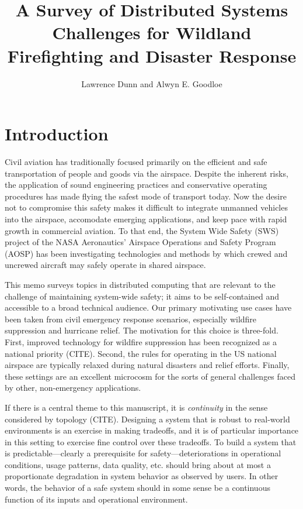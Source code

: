 \documentclass[]             %
{NASA}                       %
\title{A Survey of Distributed Systems Challenges for Wildland
Firefighting and Disaster Response}
\author{Lawrence Dunn and Alwyn E. Goodloe}
\theoremstyle{definition}
\begin{document}
\newpage
\setcounter{tocdepth}{2}
\tableofcontents
\newpage

\hypertarget{introduction}{%
\section{Introduction}\label{introduction}}

Civil aviation has traditionally focused primarily on the efficient and
safe transportation of people and goods via the airspace. Despite the
inherent risks, the application of sound engineering practices and
conservative operating procedures has made flying the safest mode of
transport today. Now the desire not to compromise this safety makes it
difficult to integrate unmanned vehicles into the airspace, accomodate
emerging applications, and keep pace with rapid growth in commercial
aviation. To that end, the System Wide Safety (SWS) project of the NASA
Aeronautics' Airspace Operations and Safety Program (AOSP) has been
investigating technologies and methods by which crewed and uncrewed
aircraft may safely operate in shared airspace.

This memo surveys topics in distributed computing that are relevant to
the \mbox{challenge} of maintaining system-wide safety; it aims to be
self-contained and accessible to a broad technical audience. Our primary
motivating use cases have been taken from civil emergency response
scenarios, especially wildfire suppression and hurricane relief. The
motivation for this choice is three-fold. First, improved technology for
wildfire suppression has been recognized as a national priority (CITE).
Second, the rules for operating in the US national airspace are
typically relaxed during natural disasters and relief efforts. Finally,
these settings are an excellent microcosm for the sorts of general
challenges faced by other, non-emergency applications.

If there is a central theme to this manuscript, it is \emph{continuity}
in the sense considered by topology (CITE). Designing a system that is
robust to real-world environments is an exercise in making tradeoffs,
and it is of particular importance in this setting to exercise fine
control over these tradeoffs. To build a system that is
predictable---clearly a prerequisite for safety---deteriorations in
operational conditions, usage patterns, data quality, etc. should bring
about at most a proportionate degradation in system behavior as observed
by users. In other words, the behavior of a safe system should in some
sense be a continuous function of its inputs and operational
environment.
\end{document}
